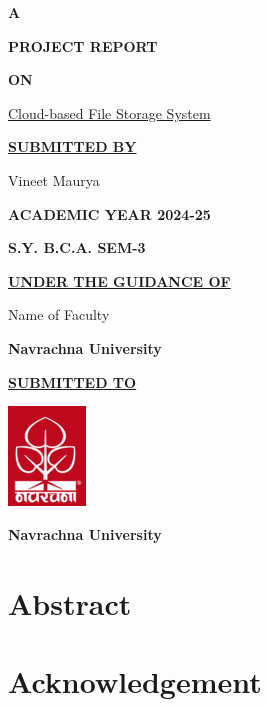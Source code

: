 \documentclass[12pt,a4paper]{report}
\begin{document}
\begin{center}
    \textbf{\LARGE{A}}

    \textbf{\LARGE{PROJECT REPORT}}

    \textbf{\LARGE{ON}}

    \Large{\underline{Cloud-based File Storage System}}
    \vspace{1cm}

    \textbf{\underline{SUBMITTED BY}}

    Vineet Maurya
    \vspace{1cm}

    \textbf{ACADEMIC YEAR 2024-25}

    \textbf{S.Y. B.C.A. SEM-3}
    \vspace{1cm}

    \textbf{\underline{UNDER THE GUIDANCE OF}}

    Name of Faculty

    \textbf{Navrachna University}
    \vspace{1cm}

    \textbf{\underline{SUBMITTED TO}}
    \vspace{0.5cm}

    \includegraphics{nuv_logo.png}
    \vspace{0.5cm}

    \textbf{Navrachna University}
\end{center}
\newpage
{}
\setcounter{page}{1}
\chapter*{Abstract}
\newpage
\chapter*{Acknowledgement}
\newpage
\end{document}
